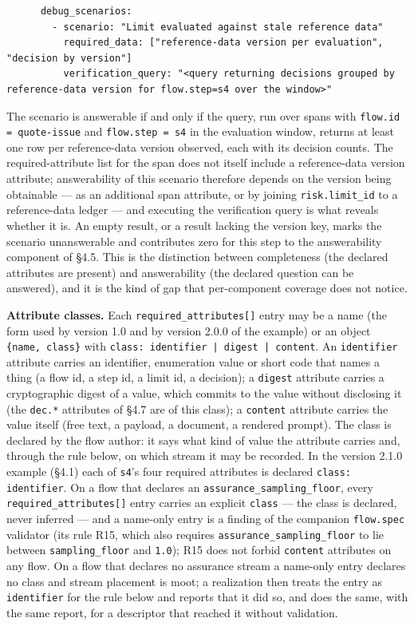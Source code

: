 \documentclass[11pt]{article}
\newcommand{\code}[1]{\texttt{#1}}
\begin{document}
\begin{lstlisting}
      debug_scenarios:
        - scenario: "Limit evaluated against stale reference data"
          required_data: ["reference-data version per evaluation", "decision by version"]
          verification_query: "<query returning decisions grouped by reference-data version for flow.step=s4 over the window>"
\end{lstlisting}

The scenario is answerable if and only if the query, run over spans with \code{flow.id = quote-issue} and \code{flow.step = s4} in the evaluation window, returns at least one row per reference-data version observed, each with its decision counts. The required-attribute list for the span does not itself include a reference-data version attribute; answerability of this scenario therefore depends on the version being obtainable --- as an additional span attribute, or by joining \code{risk.limit\_id} to a reference-data ledger --- and executing the verification query is what reveals whether it is. An empty result, or a result lacking the version key, marks the scenario unanswerable and contributes zero for this step to the answerability component of \S4.5. This is the distinction between completeness (the declared attributes are present) and answerability (the declared question can be answered), and it is the kind of gap that per-component coverage does not notice.

\textbf{Attribute classes.} Each \code{required\_attributes[]} entry may be a name (the form used by version 1.0 and by version 2.0.0 of the example) or an object \code{\{name, class\}} with \code{class: identifier | digest | content}. An \code{identifier} attribute carries an identifier, enumeration value or short code that names a thing (a flow id, a step id, a limit id, a decision); a \code{digest} attribute carries a cryptographic digest of a value, which commits to the value without disclosing it (the \code{dec.*} attributes of \S4.7 are of this class); a \code{content} attribute carries the value itself (free text, a payload, a document, a rendered prompt). The class is declared by the flow author: it says what kind of value the attribute carries and, through the rule below, on which stream it may be recorded. In the version 2.1.0 example (\S4.1) each of \code{s4}'s four required attributes is declared \code{class: identifier}. On a flow that declares an \code{assurance\_sampling\_floor}, every \code{required\_attributes[]} entry carries an explicit \code{class} --- the class is declared, never inferred --- and a name-only entry is a finding of the companion \code{flow.spec} validator (its rule R15, which also requires \code{assurance\_sampling\_floor} to lie between \code{sampling\_floor} and \code{1.0}); R15 does not forbid \code{content} attributes on any flow. On a flow that declares no assurance stream a name-only entry declares no class and stream placement is moot; a realization then treats the entry as \code{identifier} for the rule below and reports that it did so, and does the same, with the same report, for a descriptor that reached it without validation.
\end{document}
